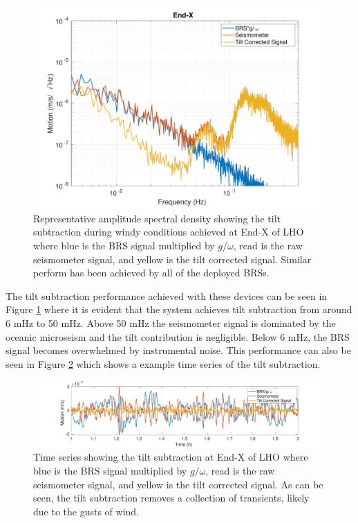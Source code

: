 \documentclass [12pt, proquest]{uwthesis}[2019]
\begin{document}
\begin{figure}%
\begin{center}
\includegraphics[width=\textwidth]{HSubtractionETMX.pdf}
\caption{Representative amplitude spectral density showing the tilt subtraction during windy conditions achieved at End-X of LHO where blue is the BRS signal multiplied by $g/\omega$, read is the raw seismometer signal, and yellow is the tilt corrected signal. Similar perform has been achieved by all of the deployed BRSs.}
\label{sub}
\end{center}
\end{figure}

The tilt subtraction performance achieved with these devices can be seen in Figure \ref{sub} where it is evident that the system achieves tilt subtraction from around 6 mHz to 50 mHz. Above 50 mHz the seismometer signal is dominated by the oceanic microseism and the tilt contribution is negligible. Below 6 mHz, the BRS signal becomes overwhelmed by instrumental noise. This performance can also be seen in Figure \ref{subTime} which shows a example time series of the tilt subtraction. 

\begin{figure}%
\begin{center}
\includegraphics[width=\textwidth]{TiltCorrTime.pdf}
\caption{Time series showing the tilt subtraction at End-X of LHO where blue is the BRS signal multiplied by $g/\omega$, read is the raw seismometer signal, and yellow is the tilt corrected signal. As can be seen, the tilt subtraction removes a collection of transients, likely due to the gusts of wind.}
\label{subTime}
\end{center}
\end{figure}
\end{document}

